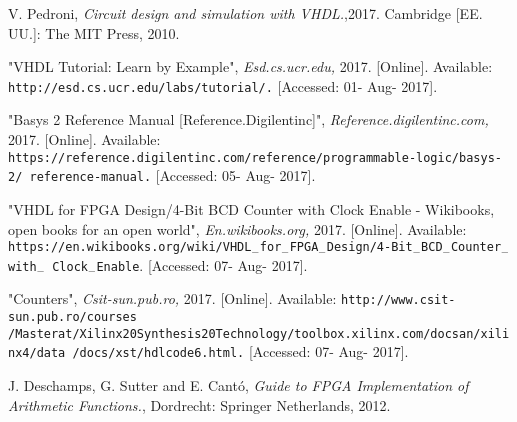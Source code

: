 \renewcommand{\refname}{}
\begin{thebibliography}{}
\vspace*{-1cm}
%


V. Pedroni,
\textit{Circuit design and simulation with VHDL.},2017. Cambridge [EE. UU.]: The MIT Press, 2010.

"VHDL Tutorial: Learn by Example",
\textit{Esd.cs.ucr.edu,} 2017. [Online]. Available: \texttt{http://esd.cs.ucr.edu/labs/tutorial/.} [Accessed: 01- Aug- 2017].

"Basys 2 Reference Manual [Reference.Digilentinc]",
\textit{ Reference.digilentinc.com,}  2017. [Online]. Available: \texttt{https://reference.digilentinc.com/reference/programmable-logic/basys-2/ reference-manual.} [Accessed: 05- Aug- 2017].

"VHDL for FPGA Design/4-Bit BCD Counter with Clock Enable - Wikibooks, open books for an open world",\textit{ En.wikibooks.org,}  2017. [Online]. Available: \texttt{https://en.wikibooks.org/wiki/VHDL$ _{-}$for$ _{-} $FPGA$ _{-} $Design/4-Bit$ _{-} $BCD$ _{-} $Counter$ _{-} $with$ _{-} $ Clock$ _{-} $Enable}. [Accessed: 07- Aug- 2017].

"Counters",\textit{ Csit-sun.pub.ro,}  2017. [Online]. Available: \texttt{http://www.csit-sun.pub.ro/courses /Masterat/Xilinx\textdiscount 20Synthesis\textdiscount20Technology/toolbox.xilinx.com/docsan/xilinx4/data /docs/xst/hdlcode6.html.} [Accessed: 07- Aug- 2017].

J. Deschamps, G. Sutter and E. Cant\'{o},
\textit{Guide to FPGA Implementation of Arithmetic Functions.}, Dordrecht: Springer Netherlands, 2012.
\end{thebibliography}
